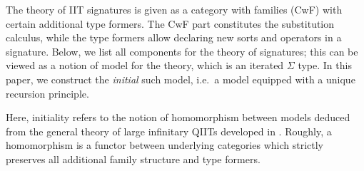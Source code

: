 \documentclass[a4paper,UKenglish,cleveref, autoref]{lipics-v2019}
\begin{document}
The theory of IIT signatures is given as a category with families
(CwF) \cite{Dybjer96internaltype} with certain additional type formers. The CwF
part constitutes the substitution calculus, while the type formers allow
declaring new sorts and operators in a signature. Below, we list all components
for the theory of signatures; this can be viewed as a notion of model for the
theory, which is an iterated $\Sigma$ type. In this paper, we construct the
\emph{initial} such model, i.e.\ a model equipped with a unique recursion principle.

Here, initiality refers to the notion of homomorphism between models deduced
from the general theory of large infinitary QIITs developed in \cite{large_inf_qiit}.
Roughly, a homomorphism is a functor between underlying
categories which strictly preserves all additional family structure and type
formers.
\end{document}
